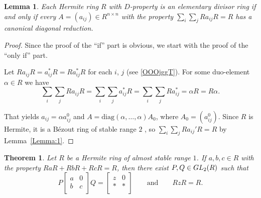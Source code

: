 \documentclass[10pt,a4paper]{amsart}
\def\GL{\rm GL}
\theoremstyle{plain}
\newtheorem{theorem}{Theorem}
\newtheorem{lemma}{Lemma}
\theoremstyle{definition}
\begin{document}


\begin{lemma}\label{Lemma:3}
Each  Hermite ring  $R$ with   $D$-property  is an elementary divisor ring if and only if every  $A=(a_{ij})\in R^{n\times n}$ with the property   $\sum\limits_{i}\sum\limits_{j} Ra_{ij}R=R$ has a canonical diagonal reduction.
\end{lemma}

\begin{proof} Since the proof of the ``if'' part  is obvious, we start with the proof of the ``only if'' part.

Let $Ra_{ij}R= a_{ij}^*R= Ra_{ij}^*R$ for  each $i$, $j$ (see \eqref{OOOjggT}). For some duo-element $\alpha\in R$ we have
\[
\sum\limits_{i}\sum\limits_{j} Ra_{ij}R=\sum\limits_{i}\sum\limits_{j} a_{ij}^*R=\sum\limits_{i}\sum\limits_{j} Ra_{ij}^*=\alpha R=R\alpha.
\]

That yields  $a_{ij}=\alpha a_{ij}^0$ and $ A=\mathrm{diag}(\alpha,\dots,\alpha)A_0$, where $A_0= (a_{ij}^0)$.
Since $R$ is Hermite, it  is a B\'ezout ring of stable range $2$ \cite[p.\,30, Collorarly $2$.1.3, Theorem $1$.2.40]{12-zabavsky}, so  $\sum_i\sum_jRa_{ij}'R=R$ by Lemma~\ref{Lemma:1}.
\end{proof}




\begin{theorem}\label{T:12}
Let $R$ be a Hermite ring of almost stable range $1$.  If $a,b,c\in R$ with the property  $RaR+RbR+RcR=R$, then there exist $P, Q\in \GL_{2}(R)$ such that
\[
P\left[
\begin{array}{cc}
a & 0 \\
b & c\\
\end{array}\right]Q=\left[
\begin{array}{cc}
z & 0 \\
* & *\\
\end{array}
\right]\qquad \text{and}\qquad   RzR=R.
\]
\end{theorem}
\end{document}
